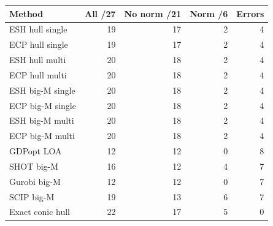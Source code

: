 \begin{tabular}{lrrrr}
\toprule
Method & All /27 & No norm /21 & Norm /6 & Errors \\
\midrule
ESH hull single & 19 & 17 & 2 & 4 \\
ECP hull single & 19 & 17 & 2 & 4 \\
ESH hull multi & 20 & 18 & 2 & 4 \\
ECP hull multi & 20 & 18 & 2 & 4 \\
ESH big-M single & 20 & 18 & 2 & 4 \\
ECP big-M single & 20 & 18 & 2 & 4 \\
ESH big-M multi & 20 & 18 & 2 & 4 \\
ECP big-M multi & 20 & 18 & 2 & 4 \\
GDPopt LOA & 12 & 12 & 0 & 8 \\
SHOT big-M & 16 & 12 & 4 & 7 \\
Gurobi big-M & 12 & 12 & 0 & 7 \\
SCIP big-M & 19 & 13 & 6 & 7 \\
Exact conic hull & 22 & 17 & 5 & 0 \\
\bottomrule
\end{tabular}

